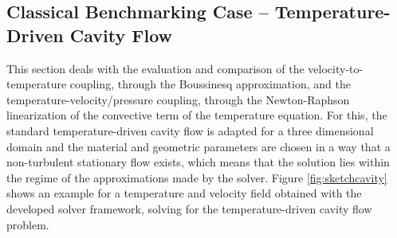 \subsection{Classical Benchmarking Case -- Temperature-Driven Cavity Flow}

This section deals with the evaluation and comparison of the velocity-to-temperature coupling, through the Boussinesq approximation, and the temperature-velocity/pressure coupling, through the Newton-Raphson linearization of the convective term of the temperature equation. For this, the standard temperature-driven cavity flow \cite{christon02,vahl83} is adapted for a three dimensional domain and the material and geometric parameters are chosen in a way that a non-turbulent stationary flow exists, which means that the solution lies within the regime of the approximations made by the solver. Figure \ref{fig:sketchcavity} shows an example for a temperature and velocity field obtained with the developed solver framework, solving for the temperature-driven cavity flow problem.

